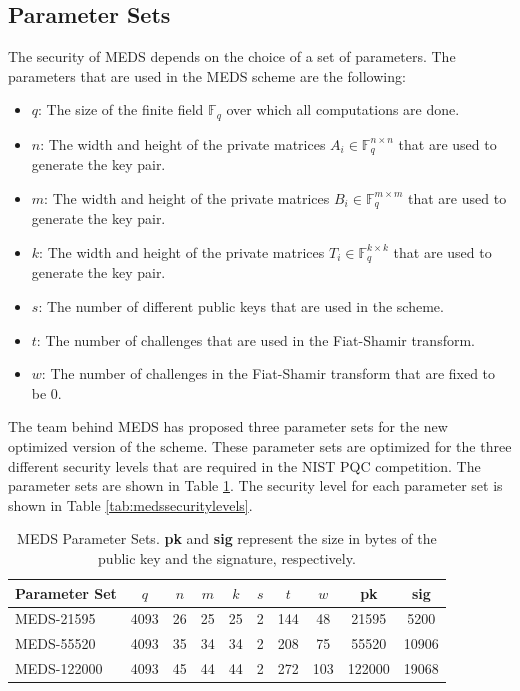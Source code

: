 \documentclass[11pt,a4paper]{report}
\theoremstyle{definition}
\begin{document}
\subsection{Parameter Sets}
\label{sec:parametersets}
The security of MEDS depends on the choice of a set of parameters. The parameters that are used in the MEDS scheme are the following:
\begin{itemize}
  \item $q$: The size of the finite field $\mathbb{F}_q$ over which all computations are done.
  \item $n$: The width and height of the private matrices $A_i \in \mathbb{F}_q^{n \times n}$ that are used to generate the key pair.
  \item $m$: The width and height of the private matrices $B_i \in \mathbb{F}_q^{m \times m}$ that are used to generate the key pair.
  \item $k$: The width and height of the private matrices $T_i \in \mathbb{F}_q^{k \times k}$ that are used to generate the key pair.
  \item $s$: The number of different public keys that are used in the scheme.
  \item $t$: The number of challenges that are used in the Fiat-Shamir transform.
  \item $w$: The number of challenges in the Fiat-Shamir transform that are fixed to be 0.
\end{itemize}

The team behind MEDS has proposed three parameter sets for the new optimized version of the scheme. These parameter sets are optimized for the three different security levels that are required in the NIST PQC competition. The parameter sets are shown in Table \ref{tab:medsparametersets}. The security level for each parameter set is shown in Table \ref{tab:medssecuritylevels}.

\begin{table}
  \centering
  \begin{tabular}{lccccccccc}
    \toprule
    \textbf{Parameter Set} & \textbf{$q$} & \textbf{$n$} & \textbf{$m$} & \textbf{$k$} & \textbf{$s$} & \textbf{$t$} & \textbf{$w$} & \textbf{pk} & \textbf{sig} \\
    \midrule
    MEDS-21595 & 4093 & 26 & 25 & 25 & 2 & 144 & 48 & 21595 & 5200 \\
    MEDS-55520 & 4093 & 35 & 34 & 34 & 2 & 208 & 75 & 55520 & 10906 \\
    MEDS-122000 & 4093 & 45 & 44 & 44 & 2 & 272 & 103 & 122000 & 19068 \\
    \bottomrule
  \end{tabular}
  \caption{MEDS Parameter Sets. \textbf{pk} and \textbf{sig} represent the size in bytes of the public key and the signature, respectively.}
  \label{tab:medsparametersets}
\end{table}
\end{document}
